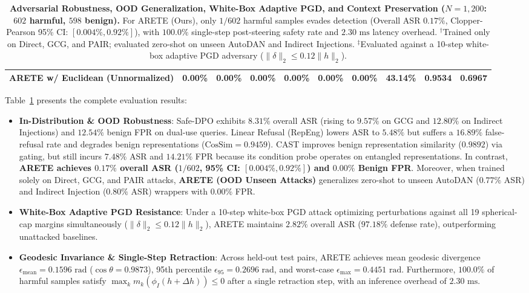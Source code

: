 \documentclass[11pt,twocolumn,a4paper]{article}
\begin{document}
\begin{table}[t]
{\begin{tabular}{l|c|ccccc|c|cc}
ARETE w/ Euclidean (Unnormalized) & 0.00\% & 0.00\% & 0.00\% & 0.00\% & 0.00\% & 0.00\% & 43.14\% & 0.9534 & 0.6967 \\
\bottomrule
\end{tabular}
}
\caption{\textbf{Adversarial Robustness, OOD Generalization, White-Box Adaptive PGD, and Context Preservation ($N=1,200$: $602$ harmful, $598$ benign).} For ARETE (Ours), only $1/602$ harmful samples evades detection (Overall ASR $0.17\%$, Clopper-Pearson 95\% CI: $[0.004\%, 0.92\%]$), with $100.0\%$ single-step post-steering safety rate and $2.30\text{ ms}$ latency overhead. $^\dagger$Trained only on Direct, GCG, and PAIR; evaluated zero-shot on unseen AutoDAN and Indirect Injections. $^\ddagger$Evaluated against a 10-step white-box adaptive PGD adversary ($\|\delta\|_2 \le 0.12\|h\|_2$).}
\label{tab:main_benchmark}
\end{table}

Table~\ref{tab:main_benchmark} presents the complete evaluation results:
\begin{itemize}[leftmargin=*,nosep]
    \item \textbf{In-Distribution \& OOD Robustness}: Safe-DPO exhibits $8.31\%$ overall ASR (rising to $9.57\%$ on GCG and $12.80\%$ on Indirect Injections) and $12.54\%$ benign FPR on dual-use queries. Linear Refusal (RepEng) lowers ASR to $5.48\%$ but suffers a $16.89\%$ false-refusal rate and degrades benign representations ($\text{CosSim} = 0.9459$). CAST improves benign representation similarity ($0.9892$) via gating, but still incurs $7.48\%$ ASR and $14.21\%$ FPR because its condition probe operates on entangled representations. In contrast, \textbf{ARETE achieves $0.17\%$ overall ASR ($1/602$, 95\% CI: $[0.004\%, 0.92\%]$) and $0.00\%$ Benign FPR}. Moreover, when trained solely on Direct, GCG, and PAIR attacks, \textbf{ARETE (OOD Unseen Attacks)} generalizes zero-shot to unseen AutoDAN ($0.77\%$ ASR) and Indirect Injection ($0.80\%$ ASR) wrappers with $0.00\%$ FPR.
    \item \textbf{White-Box Adaptive PGD Resistance}: Under a 10-step white-box PGD attack optimizing perturbations against all 19 spherical-cap margins simultaneously ($\|\delta\|_2 \le 0.12\|h\|_2$), ARETE maintains $2.82\%$ overall ASR ($97.18\%$ defense rate), outperforming unattacked baselines.
    \item \textbf{Geodesic Invariance \& Single-Step Retraction}: Across held-out test pairs, ARETE achieves mean geodesic divergence $\epsilon_{\text{mean}} = 0.1596\text{ rad}$ ($\cos\theta = 0.9873$), 95th percentile $\epsilon_{95} = 0.2696\text{ rad}$, and worst-case $\epsilon_{\max} = 0.4451\text{ rad}$. Furthermore, $100.0\%$ of harmful samples satisfy $\max_k m_k(\phi_I(h + \Delta h)) \le 0$ after a single retraction step, with an inference overhead of $2.30\text{ ms}$.
\end{itemize}
\end{document}
